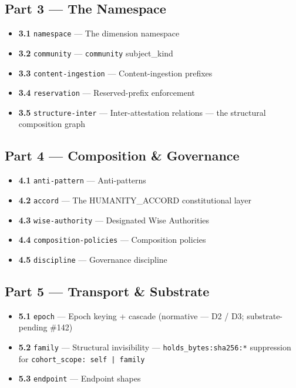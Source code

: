 \documentclass[11pt]{article}
\begin{document}
\subsection*{Part 3 — The Namespace}


\begin{itemize}\setlength\itemsep{0pt}
\item \textbf{3.1} \texttt{namespace} — The dimension namespace
\item \textbf{3.2} \texttt{community} — \texttt{community} subject\_kind
\item \textbf{3.3} \texttt{content-ingestion} — Content-ingestion prefixes
\item \textbf{3.4} \texttt{reservation} — Reserved-prefix enforcement
\item \textbf{3.5} \texttt{structure-inter} — Inter-attestation relations — the structural composition graph
\end{itemize}


\subsection*{Part 4 — Composition \& Governance}


\begin{itemize}\setlength\itemsep{0pt}
\item \textbf{4.1} \texttt{anti-pattern} — Anti-patterns
\item \textbf{4.2} \texttt{accord} — The HUMANITY\_ACCORD constitutional layer
\item \textbf{4.3} \texttt{wise-authority} — Designated Wise Authorities
\item \textbf{4.4} \texttt{composition-policies} — Composition policies
\item \textbf{4.5} \texttt{discipline} — Governance discipline
\end{itemize}


\subsection*{Part 5 — Transport \& Substrate}


\begin{itemize}\setlength\itemsep{0pt}
\item \textbf{5.1} \texttt{epoch} — Epoch keying + cascade (normative — D2 / D3; substrate-pending \#142)
\item \textbf{5.2} \texttt{family} — Structural invisibility — \texttt{holds\_bytes:sha256:*} suppression for \texttt{cohort\_scope: self | family}
\item \textbf{5.3} \texttt{endpoint} — Endpoint shapes
\end{itemize}
\end{document}

